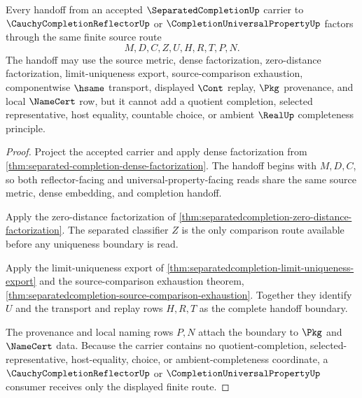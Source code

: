 \begin{theorem}
\label{thm:separatedcompletion-completion-reflector-handoff}
Every handoff from an accepted $\SeparatedCompletionUp$ carrier to $\CauchyCompletionReflectorUp$ or $\CompletionUniversalPropertyUp$ factors through the same finite source route
$$
M,D,C,Z,U,H,R,T,P,N .
$$
The handoff may use the source metric, dense factorization, zero-distance factorization, limit-uniqueness export, source-comparison exhaustion, componentwise $\hsame$ transport, displayed $\Cont$ replay, $\Pkg$ provenance, and local $\NameCert$ row, but it cannot add a quotient completion, selected representative, host equality, countable choice, or ambient $\RealUp$ completeness principle.
\end{theorem}
\begin{proof}
Project the accepted carrier and apply dense factorization from \autoref{thm:separated-completion-dense-factorization}. The handoff begins with $M,D,C$, so both reflector-facing and universal-property-facing reads share the same source metric, dense embedding, and completion handoff.

Apply the zero-distance factorization of \autoref{thm:separatedcompletion-zero-distance-factorization}. The separated classifier $Z$ is the only comparison route available before any uniqueness boundary is read.

Apply the limit-uniqueness export of \autoref{thm:separatedcompletion-limit-uniqueness-export} and the source-comparison exhaustion theorem, \autoref{thm:separatedcompletion-source-comparison-exhaustion}. Together they identify $U$ and the transport and replay rows $H,R,T$ as the complete handoff boundary.

The provenance and local naming rows $P,N$ attach the boundary to $\Pkg$ and $\NameCert$ data. Because the carrier contains no quotient-completion, selected-representative, host-equality, choice, or ambient-completeness coordinate, a $\CauchyCompletionReflectorUp$ or $\CompletionUniversalPropertyUp$ consumer receives only the displayed finite route.
\end{proof}

